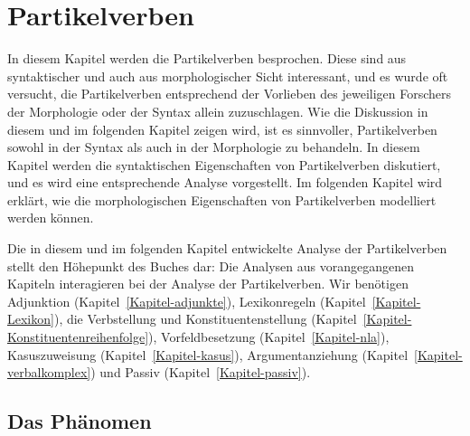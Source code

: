 \newcommand{\anf}{\emph{an$_5$}\xspace}%
\newcommand{\los}{\emph{los}\xspace}


\chapter{Partikelverben}
\label{Kapitel-partikel}

In diesem Kapitel werden die Partikelverben besprochen. Diese sind
aus syntaktischer und auch aus morphologischer Sicht interessant,
und es wurde oft versucht, die Partikelverben entsprechend der Vorlieben
des jeweiligen Forschers der Morphologie oder der Syntax allein zuzuschlagen.
Wie die Diskussion in diesem und im folgenden Kapitel zeigen wird, ist
es sinnvoller, Partikelverben sowohl in der Syntax als auch in der Morphologie
zu behandeln. In diesem Kapitel werden die syntaktischen Eigenschaften
von Partikelverben diskutiert, und es wird eine entsprechende Analyse vorgestellt.
Im folgenden Kapitel wird erklärt, wie die morphologischen Eigenschaften
von Partikelverben modelliert werden können.

Die in diesem und im folgenden Kapitel entwickelte Analyse der Partikelverben stellt
den Höhepunkt des Buches dar: Die Analysen aus vorangegangenen Kapiteln interagieren
bei der Analyse der Partikelverben. Wir benötigen Adjunktion (Kapitel~\ref{Kapitel-adjunkte}),
Lexikonregeln (Kapitel~\ref{Kapitel-Lexikon}), die Verbstellung und Konstituentenstellung 
(Kapitel~\ref{Kapitel-Konstituentenreihenfolge}), Vorfeldbesetzung (Kapitel~\ref{Kapitel-nla}),
Kasuszuweisung (Kapitel~\ref{Kapitel-kasus}),
Argumentanziehung (Kapitel~\ref{Kapitel-verbalkomplex}) und Passiv (Kapitel~\ref{Kapitel-passiv}).

\section{Das Phänomen}

